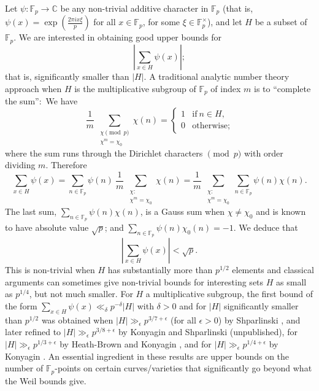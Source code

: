 \documentclass[11pt]{amsart}
\newcommand{\fp}{\mathbb{F}_p}
\newcommand{\C}{{\mathbb{C}}}
\begin{document}
Let $\psi : \fp \to \C$ be any non-trivial additive character in
$\fp$ (that is, $\psi(x)= \exp \left(\frac{2 \pi i x \xi}{p}
\right)$ for all $x\in \fp$, for some $\xi \in \fp^\times$), and
let $H$ be a subset of $\fp$. We are interested in obtaining good
upper bounds for
$$
\left| \sum_{x \in H} \psi(x)  \right| ;
$$
that is, significantly smaller than $|H|$. A traditional analytic
number theory approach when  $H$ is the multiplicative subgroup of
$\fp$ of index $m$ is to ``complete the sum'':\ We have
$$
\frac 1m \ \sum_{ \substack{\chi \pmod p \\ \chi^m=\chi_0 }}
\chi(n) = \begin{cases} 1 & \text{if}\ n\in H, \\ 0 &
\text{otherwise;}
\end{cases}
$$
where the sum runs through the Dirichlet characters $\pmod p$ with
order dividing $m$. Therefore
$$
\sum_{x \in H} \psi(x) =  \sum_{n \in \fp} \psi(n)\ \frac 1m \
\sum_{ \substack{\chi: \\ \chi^m=\chi_0 }} \chi(n) = \frac 1m \
\sum_{ \substack{\chi: \\ \chi^m=\chi_0 }} \sum_{n \in \fp}
\psi(n) \chi(n) .
$$
The last sum, $\sum_{n \in \fp} \psi(n) \chi(n)$, is  a Gauss sum
when $\chi\ne \chi_0$ and is known to have absolute value
$\sqrt{p}$; and $\sum_{n \in \fp} \psi(n) \chi_0(n)=-1$. We deduce
that
$$
\left| \sum_{x \in H} \psi(x)  \right| < \sqrt{p}.
$$
This is non-trivial when $H$ has substantially more than $p^{1/2}$
elements and classical arguments can sometimes give non-trivial bounds
for interesting sets $H$ as small as $p^{1/4}$, but not much smaller.
For $H$ a multiplicative subgroup, the first bound of the form
$\sum_{x \in H} \psi(x) \ll_\delta p^{-\delta}|H|$ with $\delta>0$ and
for $|H|$ significantly smaller than $p^{1/2}$ was obtained when $|H|
\gg_\epsilon p^{3/7+\epsilon}$ (for all $\epsilon>0$) by Shparlinski
\cite{shp91-gauss-sums}, and later refined to $|H| \gg_\epsilon
p^{3/8+\epsilon}$ by Konyagin and Shparlinski (unpublished), for $|H|
\gg_\epsilon p^{1/3+\epsilon}$ by Heath-Brown and Konyagin 
\cite{heko00-gauss-sum}, and for $|H| \gg_\epsilon p^{1/4+\epsilon}$
by Konyagin \cite{kon02-gauss-sums}.  An essential ingredient in
these results are upper bounds on the number of $\fp$-points on
certain curves/varieties that significantly go beyond what the Weil
bounds give.
\end{document}
